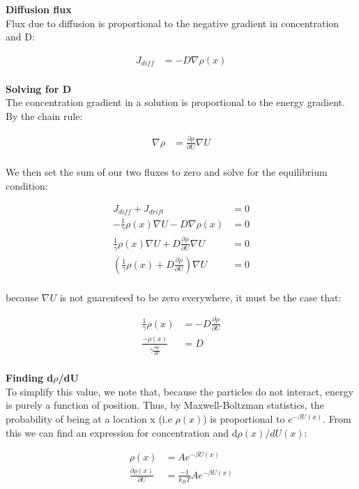 \documentclass[10pt]{article} %
\begin{document}
\textbf{Diffusion flux}\\
Flux due to diffusion is proportional to the negative gradient in concentration and D:

\begin{align*}
  J_{diff} &= -D\nabla \rho(x)\\
\end{align*}

\textbf{Solving for D}\\
The concentration gradient in a solution is proportional to the energy gradient. By the chain rule:

\begin{align*}
  \nabla \rho &= \frac{\partial\rho}{\partial U} \nabla U\\
\end{align*}

We then set the sum of our two fluxes to zero and solve for the equilibrium condition:

\begin{align*}
  J_{diff} + J_{drift} &= 0\\
  -\frac{1}{\gamma}\rho(x)\nabla U - D\nabla \rho(x) &= 0\\
  \frac{1}{\gamma}\rho(x)\nabla U + D \frac{\partial\rho}{\partial U} \nabla U&= 0\\
  \left(\frac{1}{\gamma}\rho(x) + D\frac{\partial\rho}{\partial U}\right)\nabla U &= 0\\
\end{align*}

because $\nabla U$ is not guarenteed to be zero everywhere, it must be the case that:

\begin{align*}
  \frac{1}{\gamma}\rho(x) &= -D\frac{\partial\rho}{\partial U}\\
  \frac{-\rho(x)}{\gamma\frac{\partial\rho}{\partial U}} &= D\\
\end{align*}

\textbf{Finding d$\rho$/dU}\\
To simplify this value, we note that, because the particles do not interact, energy is purely a function of position. Thus, by
Maxwell-Boltzman statistics, the probability of being at a location x (i.e $\rho(x)$) is proportional to $e^{-\beta U(x)}$.
From this we can find an expression for concentration and d$\rho(x)/dU(x)$:

\begin{align*}
  \rho(x) &= Ae^{-\beta U(x)}\\
  \frac{\partial \rho(x)}{\partial U} &= \frac{-1}{k_BT}Ae^{-\beta U(x)}\\
\end{align*}
\end{document}
